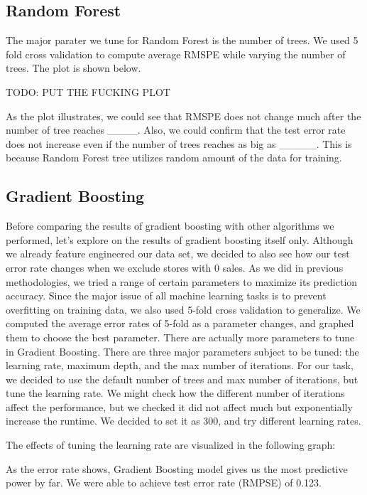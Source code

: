 \documentclass[letterpaper,twocolumn,10pt]{article}
\begin{document}
\subsection{Random Forest}
The major parater we tune for Random Forest is the number of trees. We used 5 fold cross validation to compute average RMSPE while varying the number of trees. The plot is shown below. 

TODO: PUT THE FUCKING PLOT

As the plot illustrates, we could see that RMSPE does not change much after the number of tree reaches ____. Also, we could confirm that the test error rate does not increase even if the number of trees reaches as big as _____. This is because Random Forest tree utilizes random amount of the data for training. 


\subsection{Gradient Boosting}
Before comparing the results of gradient boosting with other algorithms we performed, let's explore on the results of gradient boosting itself only. Although we already feature engineered our data set, we decided to also see how our test error rate changes when we exclude stores with 0 sales. As we did in previous methodologies, we tried a range of certain parameters to maximize its prediction accuracy. Since the major issue of all machine learning tasks is to prevent overfitting on training data, we also used 5-fold cross validation to generalize. We computed the average error rates of 5-fold as a parameter changes, and graphed them to choose the best parameter. There are actually more parameters to tune in Gradient Boosting. There are three major parameters subject to be tuned: the learning rate, maximum depth, and the max number of iterations. For our task, we decided to use the default number of trees and max number of iterations, but tune the learning rate. We might check how the different number of iterations affect the performance, but we checked it did not affect much but exponentially increase the runtime. We decided to set it as 300, and try different learning rates. 



The effects of tuning the learning rate are visualized in the following graph:


As the error rate shows, Gradient Boosting model gives us the most predictive power by far. We were able to achieve test error rate (RMPSE) of 0.123.
\end{document}
